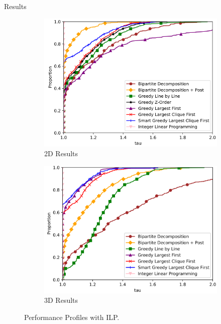 \begin{frame}{Results}
  \begin{figure}
    \centering
    \begin{subfigure}{0.49\textwidth}
      \includegraphics[width=\linewidth]{figures/2d_results.png}
      \caption{2D Results}
    \end{subfigure}
    \hfill
    \begin{subfigure}{0.49\textwidth}
      \includegraphics[width=\linewidth]{figures/3d_results.png}
      \caption{3D Results}
    \end{subfigure}
    \caption{Performance Profiles with ILP. \cite{main_paper}}
  \end{figure}  
\end{frame}